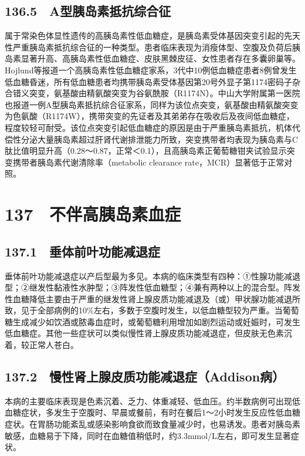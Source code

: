 \subsection{136.5　A型胰岛素抵抗综合征}

属于常染色体显性遗传的高胰岛素性低血糖症，是胰岛素受体基因突变引起的先天性严重胰岛素抵抗综合征的一种类型。患者临床表现为消瘦体型、空腹及负荷后胰岛素显著升高、高胰岛素性低血糖症、皮肤黑棘皮征、女性患者存在多囊卵巢等。Hojlund等报道一个高胰岛素性低血糖症家系，3代中10例低血糖症患者8例曾发生低血糖昏迷，所有低血糖患者均携带胰岛素受体基因第20号外显子第1174密码子杂合错义突变，氨基酸由精氨酸突变为谷氨酰胺（R1174N）。中山大学附属第一医院也报道一例A型胰岛素抵抗综合征家系，同样为该位点突变，氨基酸由精氨酸突变为色氨酸（R1174W），携带突变的先证者及其弟弟存在吸收后及夜间低血糖症，程度较轻可耐受。该位点突变引起低血糖症的原因是由于严重胰岛素抵抗，机体代偿性分泌大量胰岛素超过肝肾代谢排泄能力所致，突变携带者均表现为胰岛素与C肽比值明显升高（0.28～0.87，正常＜0.1），且高胰岛素正葡萄糖钳夹试验显示突变携带者胰岛素代谢清除率（metabolic
clearance rate，MCR）显著低于正常对照。

\protect\hypertarget{text00319.html}{}{}

\section{137　不伴高胰岛素血症}

\subsection{137.1　垂体前叶功能减退症}

垂体前叶功能减退症以产后型最为多见。本病的临床类型有四种：①性腺功能减退型；②继发性黏液性水肿型；③阵发性低血糖型；④兼有两种以上的混合型。阵发性血糖降低主要由于严重的继发性肾上腺皮质功能减退及（或）甲状腺功能减退所致，见于全部病例的10\%左右，多数于空腹时发生，以低血糖型较为严重。当葡萄糖生成减少如饮酒或脓毒血症时，或葡萄糖利用增加如剧烈运动或妊娠时，可发生低血糖症。其他一些症状可以类似慢性肾上腺皮质功能减退症，但皮肤无色素沉着，较正常人苍白。

\subsection{137.2　慢性肾上腺皮质功能减退症（Addison病）}

本病的主要临床表现是色素沉着、乏力、体重减轻、低血压。约半数病例可出现低血糖症状，多发生于空腹时、早晨或餐前，有时在餐后1～2小时发生反应性低血糖症状。在胃肠功能紊乱或感染影响食欲而致食量减少时，也易诱发。患者对胰岛素敏感，血糖易于下降，同时在血糖值稍低时，约3.3mmol/L左右，即可发生显著症状。

